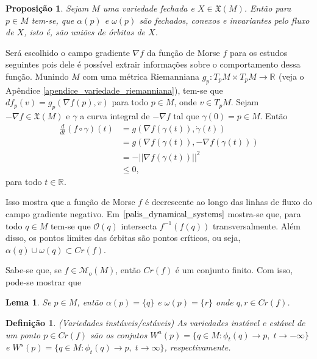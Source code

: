 \documentclass[12pt]{book}
\newtheorem{lema}[teorema]{Lema}
\newtheorem{definicao}[teorema]{Definição}
\newtheorem{proposicao}[teorema]{Proposição}
\newcommand{\campossuaves}[1]{\mathfrak{X}(#1)}
\newcommand{\derivada}[2]{\frac{d #1}{d #2}}
\newcommand{\funcoesmorse}[1]{\mathcal{M}_{o}(#1)}
\newcommand{\gradiente}{\nabla f}
\newcommand{\norma}[1]{||#1||}
\newcommand{\orbitaponto}[1]{\mathcal{O}(#1)}
\newcommand{\pontoscriticos}[1]{\textit{Cr}(#1)}
\newcommand{\real}[1]{\mathbb{R}^{#1}}
\newcommand{\reta}{\real{}}
\newcommand{\variedadeestavel}[1]{W^{s}(#1)}
\newcommand{\variedadeinstavel}[1]{W^{u}(#1)}
\begin{document}
	\begin{proposicao}
		Sejam $M$ uma variedade fechada e $X\in \campossuaves{M}$. Então para $p \in M$ tem-se, que $\alpha(p)$ e $\omega(p)$ são fechados, conexos e invariantes pelo fluxo de $X$, isto é, são uniões de órbitas de $X$.
	\end{proposicao}
	
	Será escolhido o campo gradiente $\gradiente$ da função de Morse $f$ para os estudos seguintes pois dele é possível extrair informações sobre o comportamento dessa função. Munindo $M$ com uma métrica Riemanniana $g_{p}: T_{p}M \times T_{p}M \to \reta$ (veja o Apêndice \ref{apendice_variedade_riemanniana}), tem-se que $df_{p}(v) = g_{p}(\nabla f(p), v)$ para todo $p\in M$, onde $v \in T_{p}M$. Sejam $-\gradiente \in \campossuaves{M}$ e $\gamma$ a curva integral de $-\gradiente $ tal que $\gamma(0) = p\in M$. Então
	$$
	\begin{aligned}
	\derivada{}{t}(f \circ \gamma)(t) &= g(\gradiente(\gamma(t)), \dot{\gamma}(t)) 
	\\
	&=g(\gradiente(\gamma(t)), -\gradiente(\gamma(t))) 
	\\
	&= -\norma{\gradiente(\gamma(t))}^{2}
	\\
	&\leq 0,
	\end{aligned}
	$$
	para todo $t \in \reta$.
	
	Isso mostra que a função de Morse $f$ é decrescente ao longo das linhas de fluxo do campo gradiente negativo. Em $\cite{palis_dynamical_systems}$ mostra-se que, para todo $q \in M$ tem-se que $\orbitaponto{q}$ intersecta $f^{-1}(f(q))$ transversalmente. Além disso, os pontos limites das órbitas são pontos críticos, ou seja, $\alpha(q)\cup\omega(q) \subset \pontoscriticos{f}$.
	
	Sabe-se que, se $f \in \funcoesmorse{M}$, então $\pontoscriticos{f}$ é um conjunto finito. Com isso, pode-se mostrar que 
	
	\begin{lema}\label{lema_conjunto_limite_funcao_morse}
		Se 
		$p \in M$, então $\alpha(p)  = \{q\}$ e $\omega(p) = \{r\}$ onde $q, r \in \pontoscriticos{f}$.
	\end{lema}
	
	\begin{definicao}
		(Variedades instáveis/estáveis)  As variedades instável e estável de um ponto $p \in \pontoscriticos{f}$ são os conjutos $\variedadeinstavel{p} = \{q\in M: \phi_{t}(q) \to p,\; t\to -\infty\}$ e $\variedadeestavel{p} = \{q\in M: \phi_{t}(q) \to p,\; t\to \infty\}$, respectivamente.
	\end{definicao}
	
\end{document}
